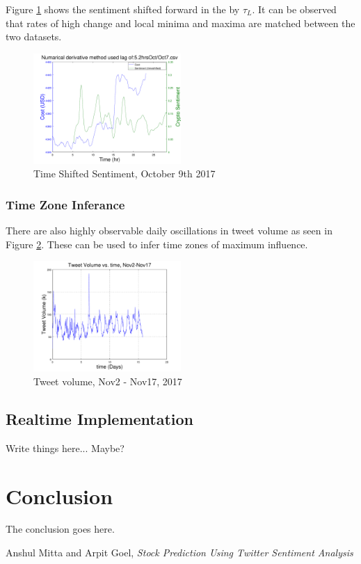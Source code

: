 \documentclass[12pt,journal,compsoc]{IEEEtran}
\begin{document}
Figure \ref{fig:SentShift} shows the sentiment shifted forward in the by $\tau_L$. It can be observed that 
rates of high change and local minima and maxima are matched between the two datasets.

\begin{figure}[h]
	\centering
	\includegraphics[width=0.5\textwidth]{../Datasets/Plots/Oct7_CostSen}
	\caption{Time Shifted Sentiment, October 9th 2017}
	\label{fig:SentShift}
\end{figure}

\subsubsection{Time Zone Inferance}
There are also highly observable daily oscillations in tweet volume as seen in Figure \ref{fig:OSC}. 
These can be used to infer time zones of maximum influence.

\begin{figure}[h!]
	\centering
	\includegraphics[width=0.5\textwidth]{../Datasets/Plots/TweetVolume}
	\caption{Tweet volume, Nov2 - Nov17, 2017}
	\label{fig:OSC}
\end{figure}

\subsection{Realtime Implementation}
Write things here... Maybe?

\section{Conclusion}
The conclusion goes here.

\begin{thebibliography}{1}

Anshul Mitta and Arpit Goel, \textit{Stock Prediction Using Twitter Sentiment Analysis}
\end{thebibliography}
\end{document}
